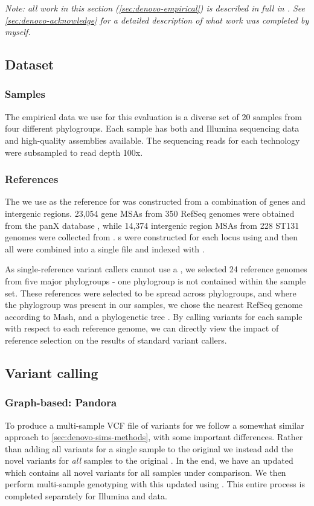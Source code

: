 \textit{Note: all work in this section (\autoref{sec:denovo-empirical}) is described in full in \cite{pandora}. See \autoref{sec:denovo-acknowledge} for a detailed description of what work was completed by myself.}

\subsection{Dataset}
\label{sec:denovo-empirical-data}

\subsubsection{Samples}
The empirical data we use for this evaluation is a diverse set of 20 \ecoli{} samples from four different phylogroups. Each sample has both \ont{} and Illumina sequencing data and high-quality assemblies available. The sequencing reads for each technology were subsampled to read depth 100x.

\subsubsection{References}
The \panrg{} we use as the reference for \pandora{} was constructed from a combination of \ecoli{} genes and intergenic regions. 23,054 gene MSAs from 350 RefSeq genomes were obtained from the panX database \cite{panx}, while 14,374 intergenic region MSAs from 228 ST131 genomes were collected from \cite{thorpe2018}. \prg{}s were constructed for each locus using \makeprg{} and then all were combined into a single \panrg{} file and indexed with \pandora{}.

As single-reference variant callers cannot use a \panrg{}, we selected 24 reference genomes from five major phylogroups - one phylogroup is not contained within the sample set. These references were selected to be spread across phylogroups, and where the phylogroup was present in our samples, we chose the nearest RefSeq genome according to Mash, and a phylogenetic tree \cite{pandora}. By calling variants for each sample with respect to each reference genome, we can directly view the impact of reference selection on the results of standard variant callers.

\subsection{Variant calling}

\subsubsection{Graph-based: Pandora}
To produce a multi-sample VCF file of variants for \pandora{} we follow a somewhat similar approach to \autoref{sec:denovo-sims-methods}, with some important differences. Rather than adding all \denovo{} variants for a single sample to the original \panrg{} we instead add the novel variants for \emph{all} samples to the original \panrg{}. In the end, we have an updated \panrg{} which contains all novel variants for all samples under comparison. We then perform multi-sample genotyping with this updated \panrg{} using \compare{}. This entire process is completed separately for Illumina and \ont{} data.

